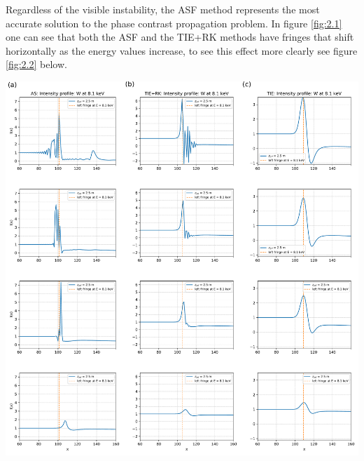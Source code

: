 \documentclass[10pt, a4paper, singlespacing]{report}
\newenvironment{Figure}
    {\par\medskip\noindent\minipage{\linewidth}}
    {\endminipage\par\medskip}
\begin{document}
Regardless of the visible instability, the ASF method represents the most accurate solution to the phase contrast propagation problem. In figure \ref{fig:2.1} one can see that both the ASF and the TIE+RK methods have fringes that shift horizontally as the energy values increase, to see this effect more clearly see figure \ref{fig:2.2} below.

\begin{Figure} 
 \centering
  \hspace*{-0.9cm}
 \includegraphics[width=\linewidth]{AS_vs_TIE+RK_vs_TIE_2.pdf}

\end{Figure}
\end{document}
